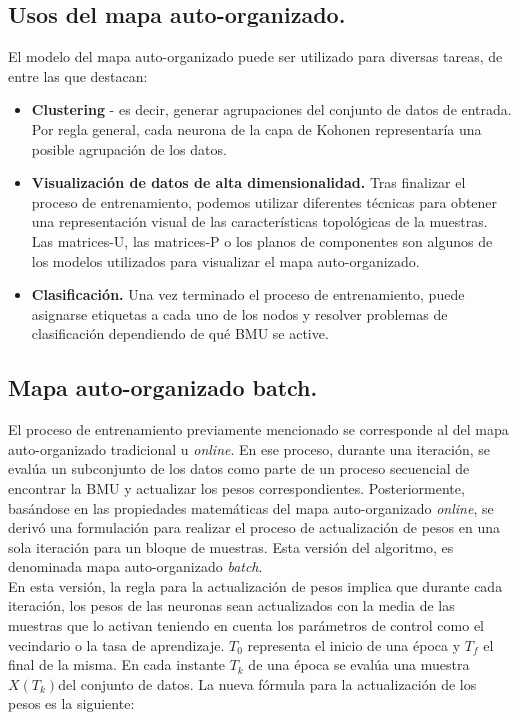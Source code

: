 \subsection{Usos del mapa auto-organizado.}
El modelo del mapa auto-organizado puede ser utilizado para diversas tareas, de entre las que destacan:

\begin{itemize}
	\item \textbf{Clustering} - es decir, generar agrupaciones del conjunto de datos de entrada. Por regla general, cada neurona de la capa de Kohonen representaría una posible agrupación de los datos. 

	\item \textbf{Visualización de datos de alta dimensionalidad.} Tras finalizar el proceso de entrenamiento, podemos utilizar diferentes técnicas para obtener una representación visual de las características topológicas de la muestras. Las matrices-U, las matrices-P o los planos de componentes son algunos de los modelos utilizados para visualizar el mapa auto-organizado.

	\item \textbf{Clasificación.} Una vez terminado el proceso de entrenamiento, puede asignarse etiquetas a cada uno de los nodos y resolver problemas de clasificación dependiendo de qué BMU se active. 
	\end{itemize}

\subsection{Mapa auto-organizado batch.}
El proceso de entrenamiento previamente mencionado se corresponde al del mapa auto-organizado tradicional u \textit{online}. En ese proceso, durante una iteración, se evalúa un subconjunto de los datos como parte de un proceso secuencial de encontrar la BMU y actualizar los pesos correspondientes. Posteriormente, basándose en las propiedades matemáticas del mapa auto-organizado \textit{online}, se derivó una formulación para realizar el proceso de actualización de pesos en una sola iteración para un bloque de muestras. Esta versión del algoritmo, es denominada mapa auto-organizado \textit{batch}. \\

En esta versión, la regla para la actualización de pesos implica que durante cada iteración, los pesos de las neuronas sean actualizados con la media de las muestras que lo activan teniendo en cuenta los parámetros de control como el vecindario o la tasa de aprendizaje. $T_0$ representa el inicio de una época y $T_f$ el final de la misma. En cada instante $T_k$ de una época se evalúa una muestra $X(T_k) $del conjunto de datos. La nueva fórmula para la actualización de los pesos es la siguiente:\\

